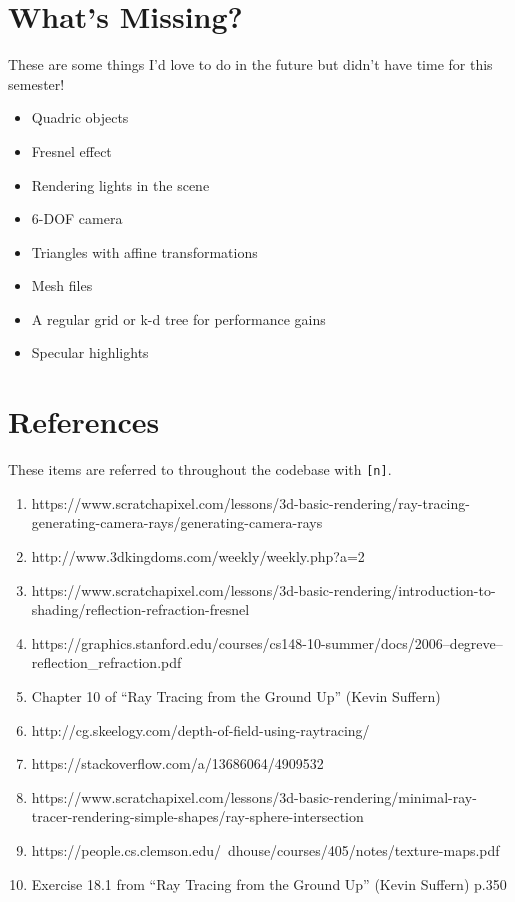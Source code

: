 \documentclass{article}
\begin{document}
\section{What's Missing?}

These are some things I'd love to do in the future but didn't have time for this semester!

\begin{itemize}
    \item Quadric objects
    \item Fresnel effect
    \item Rendering lights in the scene
    \item 6-DOF camera
    \item Triangles with affine transformations
    \item Mesh files
    \item A regular grid or k-d tree for performance gains
    \item Specular highlights
\end{itemize}

\section{References}

These items are referred to throughout the codebase with \texttt{[n]}.

\begin{enumerate}
    \item https://www.scratchapixel.com/lessons/3d-basic-rendering/ray-tracing-generating-camera-rays/generating-camera-rays
    \item http://www.3dkingdoms.com/weekly/weekly.php?a=2
    \item https://www.scratchapixel.com/lessons/3d-basic-rendering/introduction-to-shading/reflection-refraction-fresnel
    \item https://graphics.stanford.edu/courses/cs148-10-summer/docs/2006--degreve--reflection\_refraction.pdf
    \item Chapter 10 of ``Ray Tracing from the Ground Up'' (Kevin Suffern)
    \item http://cg.skeelogy.com/depth-of-field-using-raytracing/
    \item https://stackoverflow.com/a/13686064/4909532
    \item https://www.scratchapixel.com/lessons/3d-basic-rendering/minimal-ray-tracer-rendering-simple-shapes/ray-sphere-intersection
    \item https://people.cs.clemson.edu/~dhouse/courses/405/notes/texture-maps.pdf
    \item Exercise 18.1 from ``Ray Tracing from the Ground Up'' (Kevin Suffern) p.350
\end{enumerate}
\end{document}
